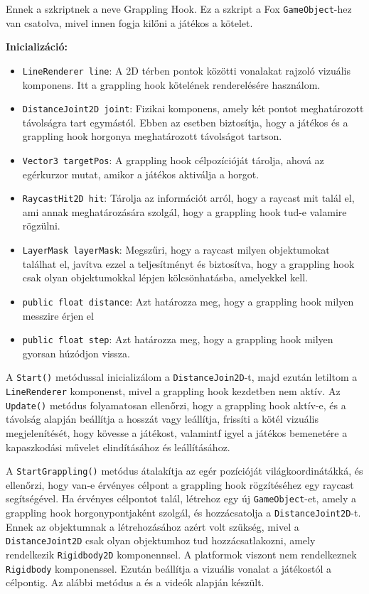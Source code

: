 Ennek a szkriptnek a neve Grappling Hook. Ez a szkript a Fox \texttt{GameObject}-hez van csatolva, mivel innen fogja kilőni a játékos a kötelet.

\textbf{Inicializáció:}
\begin{itemize}
\item \texttt{LineRenderer line}: A 2D térben pontok közötti vonalakat rajzoló vizuális komponens. Itt a grappling hook kötelének renderelésére használom.
\item \texttt{DistanceJoint2D joint}: Fizikai komponens, amely két pontot meghatározott távolságra tart egymástól. Ebben az esetben biztosítja, hogy a játékos és a grappling hook horgonya meghatározott távolságot tartson.
\item \texttt{Vector3 targetPos}: A grappling hook célpozícióját tárolja, ahová az egérkurzor mutat, amikor a játékos aktiválja a horgot.
\item \texttt{RaycastHit2D hit}: Tárolja az információt arról, hogy a raycast mit talál el, ami annak meghatározására szolgál, hogy a grappling hook tud-e valamire rögzülni.
\item \texttt{LayerMask layerMask}: Megszűri, hogy a raycast milyen objektumokat találhat el, javítva ezzel a teljesítményt és biztosítva, hogy a grappling hook csak olyan objektumokkal lépjen kölcsönhatásba, amelyekkel kell.
\item \texttt{public float distance}: Azt határozza meg, hogy a grappling hook milyen messzire érjen el
\item \texttt{public float step}: Azt határozza meg, hogy a grappling hook milyen gyorsan húzódjon vissza.
\end{itemize}

A \texttt{Start()} metódussal inicializálom a \texttt{DistanceJoin2D}-t, majd ezután letiltom a \texttt{LineRenderer} komponenst, mivel a grappling hook kezdetben nem aktív. Az \texttt{Update()} metódus folyamatosan ellenőrzi, hogy a grappling hook aktív-e, és a távolság alapján beállítja a hosszát vagy leállítja, frissíti a kötél vizuális megjelenítését, hogy kövesse a játékost, valamintf igyel a játékos bemenetére a kapaszkodási művelet elindításához és leállításához.

A \texttt{StartGrappling()} metódus átalakítja az egér pozícióját világkoordinátákká, és ellenőrzi, hogy van-e érvényes célpont a grappling hook rögzítéséhez egy raycast segítségével. Ha érvényes célpontot talál, létrehoz egy új \texttt{GameObject}-et, amely a grappling hook horgonypontjaként szolgál, és hozzácsatolja a \texttt{DistanceJoint2D}-t. Ennek az objektumnak a létrehozásához azért volt szükség, mivel a \texttt{DistanceJoint2D} csak olyan objektumhoz tud hozzácsatlakozni, amely rendelkezik \texttt{Rigidbody2D} komponennsel. A platformok viszont nem rendelkeznek \texttt{Rigidbody} komponenssel. Ezután beállítja a vizuális vonalat a játékostól a célpontig. Az alábbi metódus a \cite{grapplinghook1} és a \cite{grapplinghook2} videók alapján készült.

